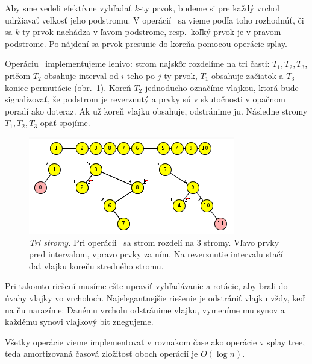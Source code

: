 
Aby sme vedeli efektívne vyhľadať $k$-ty prvok, budeme si pre každý vrchol udržiavať veľkosť jeho 
podstromu. V operácií \find\ sa vieme podľa toho rozhodnúť, či sa $k$-ty prvok nachádza v ľavom podstrome, 
resp.\ koľký prvok je v pravom podstrome. Po nájdení sa prvok presunie do koreňa pomocou operácie splay. 

Operáciu \reverse\ implementujeme lenivo: 
strom najskôr rozdelíme na tri časti: $T_1,T_2,T_3$, pričom $T_2$ obsahuje interval od $i$-teho 
po $j$-ty prvok, $T_1$ obsahuje začiatok a $T_3$ koniec permutácie (obr.~\ref{img:rev2}). 
Koreň $T_2$ jednoducho označíme vlajkou, ktorá bude signalizovať, že podstrom je reverznutý a 
prvky sú v skutočnosti v opačnom poradí ako doteraz. Ak už koreň vlajku obsahuje, odstránime ju. 
Následne stromy $T_1,T_2,T_3$ opäť spojíme.


\begin{figure}
\includegraphics[width=\columnwidth]{obrazky/rev3trees.png}
\caption{\emph{Tri stromy.} Pri operácii \reverse\ sa strom rozdelí na 3 stromy. 
Vľavo prvky pred intervalom, vpravo prvky za ním. 
Na reverznutie intervalu stačí dať vlajku koreňu stredného stromu.}
\label{img:rev2}
\end{figure}

Pri takomto riešení musíme ešte upraviť vyhľadávanie a rotácie, aby brali do úvahy vlajky vo vrcholoch.
Najelegantnejšie riešenie je odstrániť vlajku vždy, keď na ňu narazíme:
Danému vrcholu odstránime vlajku, vymeníme mu synov a každému synovi vlajkový bit znegujeme.

Všetky operácie vieme implementovať v rovnakom čase ako operácie v splay tree, teda amortizovaná 
časová zložitosť oboch operácií je $O(\log n)$.

